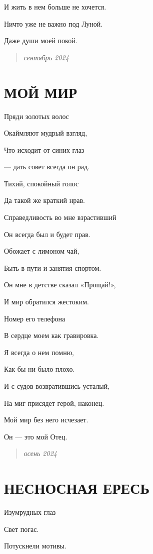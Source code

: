 \documentclass[
  a5paperpaper,
  DIV=11,
  numbers=noendperiod]{scrreprt}
\begin{document}
И жить в нем больше не хочется.

Ничто уже не важно под Луной.

Даже души моей покой.

\begin{quote}
\emph{сентябрь 2024}
\end{quote}

\section{МОЙ МИР}\label{ux43cux43eux439-ux43cux438ux440}

Пряди золотых волос

Окаймляют мудрый взгляд,

Что исходит от синих глаз

--- дать совет всегда он рад.

Тихий, спокойный голос

Да такой же краткий нрав.

Справедливость во мне взрастивший

Он всегда был и будет прав.

Обожает с лимоном чай,

Быть в пути и занятия спортом.

Он мне в детстве сказал «Прощай!»,

И мир обратился жестоким.

Номер его телефона

В сердце моем как гравировка.

Я всегда о нем помню,

Как бы ни было плохо.

И с судов возвратившись усталый,

На миг присядет герой, наконец.

Мой мир без него исчезает.

Он --- это мой Отец.

\begin{quote}
\emph{осень 2024}
\end{quote}

\section{НЕСНОСНАЯ
ЕРЕСЬ}\label{ux43dux435ux441ux43dux43eux441ux43dux430ux44f-ux435ux440ux435ux441ux44c}

Изумрудных глаз

Свет погас.

Потускнели мотивы.
\end{document}
